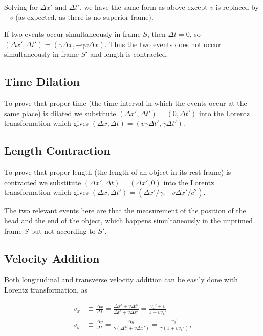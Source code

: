\documentclass[english,a4paper,12pt]{report}
\begin{document}
Solving for \(\Delta x' \text { and }  \Delta t'\), we have the same form as above except \(v\) is replaced by \(-v\) (as expected, as there is no superior frame).   


If two events occur simultaneously in frame \(S\), then \(\Delta t = 0\), so \((\Delta x', \Delta t') = (\gamma \Delta x, -\gamma v \Delta x)\). Thus the two events does not occur simultaneously in frame \(S'\) and length is contracted.

\subsection{Time Dilation}

To prove that proper time (the time interval in which the events occur at the same place) is dilated we substitute \((\Delta x', \Delta t') = (0, \Delta t')\) into the Lorentz transformation which gives \((\Delta x,\Delta t) = (v\gamma \Delta t', \gamma \Delta t')\). 

\subsection{Length Contraction}

To prove that proper length (the length of an object in its rest frame) is contracted we substitute \((\Delta x', \Delta t) = (\Delta x', 0)\) into the Lorentz transformation which gives \((\Delta x, \Delta t') = (\Delta x' / \gamma , - v\Delta x' /c^2)\).  

The two relevant events here are that the measurement of the position of the head and the end of the object, which happens simultaneously in the unprimed frame \(S\) but not according to \(S'\).

\subsection{Velocity Addition}

Both longitudinal and transverse velocity addition can be easily done with Lorentz transformation, as

\begin{equation}
    \begin{aligned}
    v_{x}  &\equiv \frac{\Delta x}{\Delta t} = \frac{\Delta x' + v\Delta t'}{\Delta t' + v\Delta x'} = \frac{v_{x} ' + v}{1+v v_{x} '} \\
    v_{y}  &\equiv \frac{\Delta y}{\Delta t} = \frac{\Delta y'}{\gamma (\Delta t' + v\Delta x')} = \frac{v_{y} '}{\gamma (1 + v v_{x} ')},
    \end{aligned}
\end{equation}
\end{document}
